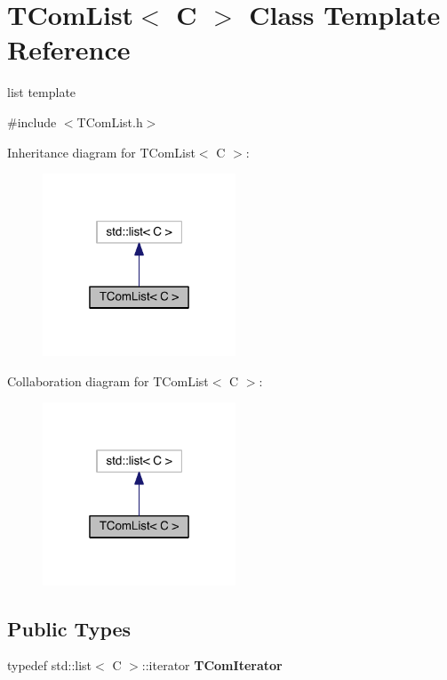 \hypertarget{class_t_com_list}{}\section{T\+Com\+List$<$ C $>$ Class Template Reference}
\label{class_t_com_list}


list template  




{\ttfamily \#include $<$T\+Com\+List.\+h$>$}



Inheritance diagram for T\+Com\+List$<$ C $>$\+:
\nopagebreak
\begin{figure}[H]
\begin{center}
\leavevmode
\includegraphics[width=163pt]{d6/d46/class_t_com_list__inherit__graph}
\end{center}
\end{figure}


Collaboration diagram for T\+Com\+List$<$ C $>$\+:
\nopagebreak
\begin{figure}[H]
\begin{center}
\leavevmode
\includegraphics[width=163pt]{db/d15/class_t_com_list__coll__graph}
\end{center}
\end{figure}
\subsection*{Public Types}
\begin{DoxyCompactItemize}
\item 
\mbox{\label{class_t_com_list_a1e7367a858c9805b030591133d4842af}} 
typedef std\+::list$<$ C $>$\+::iterator {\bfseries T\+Com\+Iterator}
\end{DoxyCompactItemize}
